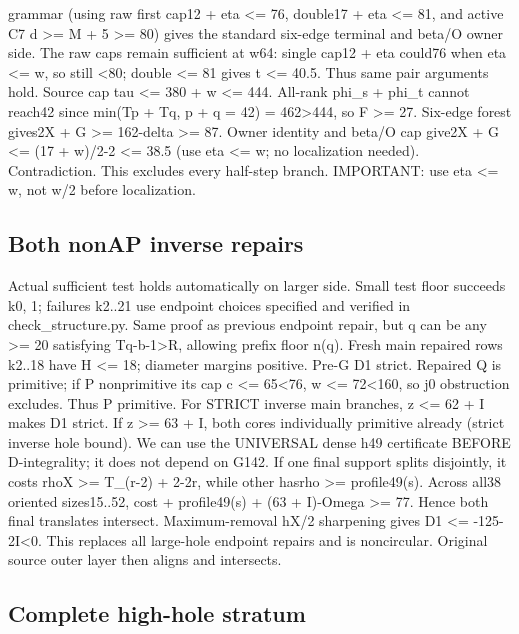 \documentclass[11pt,a4paper]{article}
\begin{document}
grammar (using raw first cap12 + eta \textless= 76, double17 + eta
\textless= 81, and active C7 d \textgreater= M + 5 \textgreater= 80)
gives the standard six-edge terminal and beta/O owner side. The raw caps
remain sufficient at w64: single cap12 + eta could76 when eta \textless=
w, so still \textless80; double \textless= 81 gives t \textless= 40.5.
Thus same pair arguments hold. Source cap tau \textless= 380 + w
\textless= 444. All-rank phi\_s + phi\_t cannot reach42 since min(Tp +
Tq, p + q = 42) = 462\textgreater444, so F \textgreater= 27. Six-edge
forest gives2X + G \textgreater= 162-delta \textgreater= 87. Owner
identity and beta/O cap give2X + G \textless= (17 + w)/2-2 \textless=
38.5 (use eta \textless= w; no localization needed). Contradiction. This
excludes every half-step branch. IMPORTANT: use eta \textless= w, not
w/2 before localization.

\hypertarget{both-nonap-inverse-repairs}{%
\subsection{Both nonAP inverse
repairs}\label{both-nonap-inverse-repairs}}

Actual sufficient test holds automatically on larger side. Small test
floor succeeds k0, 1; failures k2..21 use endpoint choices specified and
verified in check\_structure.py. Same proof as previous endpoint repair,
but q can be any \textgreater= 20 satisfying Tq-b-1\textgreater R,
allowing prefix floor n(q). Fresh main repaired rows k2..18 have H
\textless= 18; diameter margins positive. Pre-G D1 strict. Repaired Q is
primitive; if P nonprimitive its cap c \textless= 65\textless76, w
\textless= 72\textless160, so j0 obstruction excludes. Thus P primitive.
For STRICT inverse main branches, z \textless= 62 + I makes D1 strict.
If z \textgreater= 63 + I, both cores individually primitive already
(strict inverse hole bound). We can use the UNIVERSAL dense h49
certificate BEFORE D-integrality; it does not depend on G142. If one
final support splits disjointly, it costs rhoX \textgreater= T\_(r-2) +
2-2r, while other hasrho \textgreater= profile49(s). Across all38
oriented sizes15..52, cost + profile49(s) + (63 + I)-Omega \textgreater=
77. Hence both final translates intersect. Maximum-removal hX/2
sharpening gives D1 \textless= -125-2I\textless0. This replaces all
large-hole endpoint repairs and is noncircular. Original source outer
layer then aligns and intersects.

\hypertarget{complete-high-hole-stratum}{%
\subsection{Complete high-hole
stratum}\label{complete-high-hole-stratum}}
\end{document}
